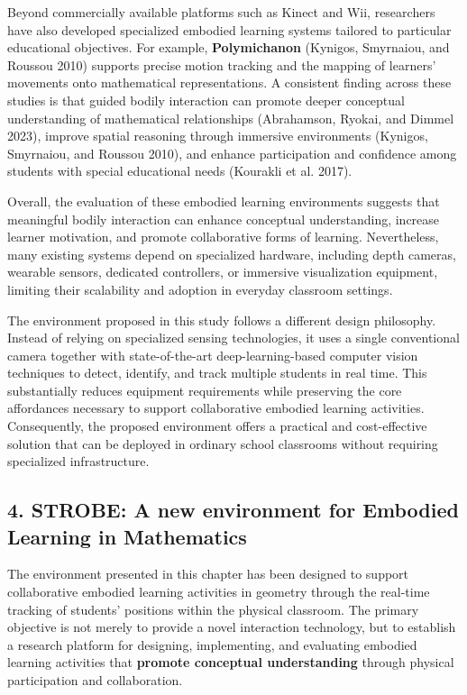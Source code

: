 Beyond commercially available platforms such as Kinect and Wii,
researchers have also developed specialized embodied learning systems
tailored to particular educational objectives. For example,
\textbf{Polymichanon} (Kynigos, Smyrnaiou, and Roussou 2010) supports
precise motion tracking and the mapping of learners' movements onto
mathematical representations. A consistent finding across these studies
is that guided bodily interaction can promote deeper conceptual
understanding of mathematical relationships (Abrahamson, Ryokai, and
Dimmel 2023), improve spatial reasoning through immersive environments
(Kynigos, Smyrnaiou, and Roussou 2010), and enhance participation and
confidence among students with special educational needs (Kourakli et
al. 2017).

Overall, the evaluation of these embodied learning environments suggests
that meaningful bodily interaction can enhance conceptual understanding,
increase learner motivation, and promote collaborative forms of
learning. Nevertheless, many existing systems depend on specialized
hardware, including depth cameras, wearable sensors, dedicated
controllers, or immersive visualization equipment, limiting their
scalability and adoption in everyday classroom settings.

The environment proposed in this study follows a different design
philosophy. Instead of relying on specialized sensing technologies, it
uses a single conventional camera together with state-of-the-art
deep-learning-based computer vision techniques to detect, identify, and
track multiple students in real time. This substantially reduces
equipment requirements while preserving the core affordances necessary
to support collaborative embodied learning activities. Consequently, the
proposed environment offers a practical and cost-effective solution that
can be deployed in ordinary school classrooms without requiring
specialized infrastructure.

\subsection{4. STROBE: A new environment for Embodied Learning in
Mathematics}\label{strobe-a-new-environment-for-embodied-learning-in-mathematics}

The environment presented in this chapter has been designed to support
collaborative embodied learning activities in geometry through the
real-time tracking of students' positions within the physical classroom.
The primary objective is not merely to provide a novel interaction
technology, but to establish a research platform for designing,
implementing, and evaluating embodied learning activities that
\textbf{promote conceptual understanding} through physical participation
and collaboration.


